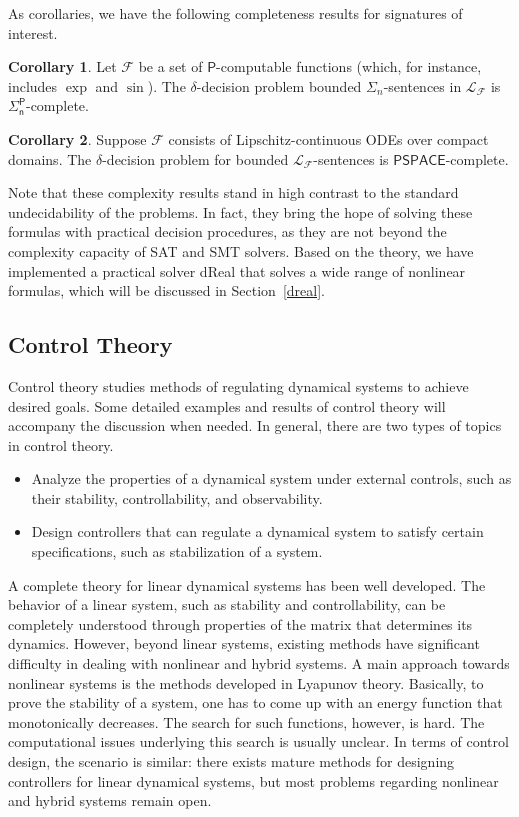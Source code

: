 \documentclass[10pt]{article}
\theoremstyle{definition}
\newtheorem{corollary}{Corollary}[section]
\begin{document}
As corollaries, we have the following completeness results for signatures of interest. 
\begin{corollary}
Let $\mathcal{F}$ be a set of $\mathsf{P}$-computable functions (which, for instance, includes $\exp$ and $\sin$). The $\delta$-decision problem bounded $\Sigma_n$-sentences in $\mathcal{L}_{\mathcal{F}}$ is $\mathsf{\Sigma_n^P}$-complete. 
\end{corollary}
\begin{corollary}
Suppose $\mathcal{F}$ consists of Lipschitz-continuous ODEs over compact domains. The $\delta$-decision problem for bounded $\mathcal{L}_{\mathcal{F}}$-sentences is $\mathsf{PSPACE}$-complete. 
\end{corollary}
Note that these complexity results stand in high contrast to the standard undecidability of the problems. In fact, they bring the hope of solving these formulas with practical decision procedures, as they are not beyond the complexity capacity of SAT and SMT solvers. Based on the theory, we have implemented a practical solver dReal that solves a wide range of nonlinear formulas, which will be discussed in Section~\ref{dreal}. 

\subsection{Control Theory} 

Control theory studies methods of regulating dynamical systems to achieve desired goals. Some detailed examples and results of control theory will accompany the discussion when needed.
In general, there are two types of topics in control theory. 
\begin{itemize}
\item Analyze the properties of a dynamical system under external controls, such as their stability, controllability, and observability. 
\item Design controllers that can regulate a dynamical system to satisfy certain specifications, such as stabilization of a system. 
\end{itemize}

A complete theory for linear dynamical systems has been well developed. The behavior of a linear system, such as stability and controllability, can be completely understood through properties of the matrix that determines its dynamics. However, beyond linear systems, existing methods have significant difficulty in dealing with nonlinear and hybrid systems. A main approach towards nonlinear systems is the methods developed in Lyapunov theory. Basically, to prove the stability of a system, one has to come up with an energy function that monotonically decreases. The search for such functions, however, is hard. The computational issues underlying this search is usually unclear. In terms of control design, the scenario is similar: there exists mature methods for designing controllers for linear dynamical systems, but most problems regarding nonlinear and hybrid systems remain open. 
\end{document}
